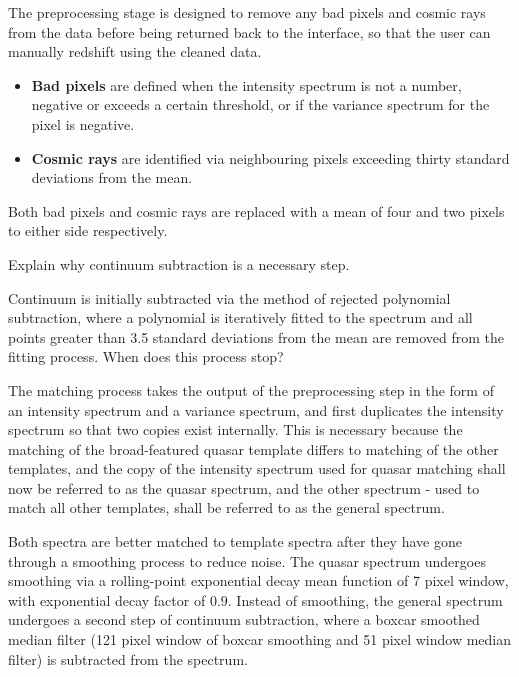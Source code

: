 \documentclass[iop]{emulateapj}
\newcommand{\tam}{\color{blue}}
\newcommand{\tamcom}{\color{red}}
\begin{document}
The preprocessing stage is designed to remove any bad pixels and cosmic rays from the data before being returned back to the interface, so that the user can manually redshift using the cleaned data. 
\begin{itemize}
\item {\bf Bad pixels} are defined when the intensity spectrum is not a number, negative or exceeds a certain threshold, or if the variance spectrum for the pixel is negative. 
\item {\bf Cosmic rays} are identified via neighbouring pixels exceeding thirty standard deviations from the mean.
\end{itemize}
Both bad pixels and cosmic rays are replaced with a mean of four and two pixels to either side respectively. 

{\tamcom  Explain why continuum subtraction is a necessary step.}

Continuum is initially subtracted via the method of rejected polynomial subtraction, where a polynomial is iteratively fitted to the spectrum and all points greater than 3.5 standard deviations from the mean are removed from the fitting process. {\tamcom When does this process stop?}  

The matching process takes the output of the preprocessing step in the form of an intensity spectrum and a variance spectrum, and first duplicates the intensity spectrum so that two copies exist internally. This is {\tam necessary because} the matching of the broad-featured quasar template differs to matching of the other templates, and the copy of the intensity spectrum used for quasar matching shall now be referred to as the quasar spectrum, and the other spectrum - used to match all other templates, shall be referred to as the general spectrum. 

{\tam Both spectra are better matched to template spectra after they have gone through a smoothing process to reduce noise.}  The quasar spectrum undergoes smoothing via a rolling-point exponential decay mean function of 7 pixel window, with exponential decay factor of $0.9$. Instead of smoothing, the general spectrum undergoes a second step of continuum subtraction, where a boxcar smoothed median filter (121 pixel window of boxcar smoothing and 51 pixel window median filter) is subtracted from the spectrum. 
\end{document}
